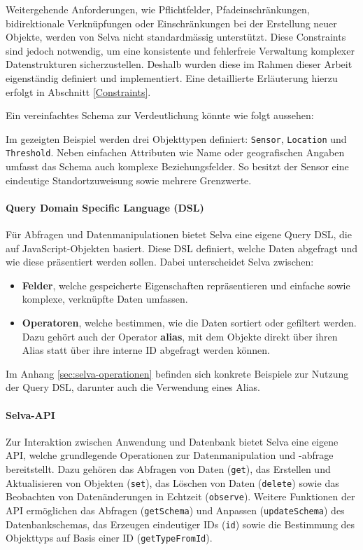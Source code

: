 Weitergehende Anforderungen, wie Pflichtfelder, Pfadeinschränkungen, bidirektionale Verknüpfungen oder Einschränkungen bei der Erstellung neuer Objekte, werden von Selva nicht standardmässig unterstützt. Diese Constraints sind jedoch notwendig, um eine konsistente und fehlerfreie Verwaltung komplexer Datenstrukturen sicherzustellen. Deshalb wurden diese im Rahmen dieser Arbeit eigenständig definiert und implementiert. Eine detaillierte Erläuterung hierzu erfolgt in Abschnitt \ref{Constraints}.


Ein vereinfachtes Schema zur Verdeutlichung könnte wie folgt aussehen:


Im gezeigten Beispiel werden drei Objekttypen definiert: \texttt{Sensor}, \texttt{Location} und \texttt{Threshold}. Neben einfachen Attributen wie Name oder geografischen Angaben umfasst das Schema auch komplexe Beziehungsfelder. So besitzt der Sensor eine eindeutige Standortzuweisung sowie mehrere Grenzwerte.

\paragraph{Query Domain Specific Language (DSL)}
Für Abfragen und Datenmanipulationen bietet Selva eine eigene Query DSL, die auf JavaScript-Objekten basiert. Diese DSL definiert, welche Daten abgefragt und wie diese präsentiert werden sollen. Dabei unterscheidet Selva zwischen:

\begin{itemize} \item \textbf{Felder}, welche gespeicherte Eigenschaften repräsentieren und einfache sowie komplexe, verknüpfte Daten umfassen.
\item \textbf{Operatoren}, welche bestimmen, wie die Daten sortiert oder gefiltert werden. Dazu gehört auch der Operator \textbf{alias}, mit dem Objekte direkt über ihren Alias statt über ihre interne ID abgefragt werden können.
\end{itemize}

Im Anhang \ref{sec:selva-operationen} befinden sich konkrete Beispiele zur Nutzung der Query DSL, darunter auch die Verwendung eines Alias.

\paragraph{Selva-API}
Zur Interaktion zwischen Anwendung und Datenbank bietet Selva eine eigene API, welche grundlegende Operationen zur Datenmanipulation und -abfrage bereitstellt. Dazu gehören das Abfragen von Daten (\texttt{get}), das Erstellen und Aktualisieren von Objekten (\texttt{set}), das Löschen von Daten (\texttt{delete}) sowie das Beobachten von Datenänderungen in Echtzeit (\texttt{observe}). Weitere Funktionen der API ermöglichen das Abfragen (\texttt{getSchema}) und Anpassen (\texttt{updateSchema}) des Datenbankschemas, das Erzeugen eindeutiger IDs (\texttt{id}) sowie die Bestimmung des Objekttyps auf Basis einer ID (\texttt{getTypeFromId}).

